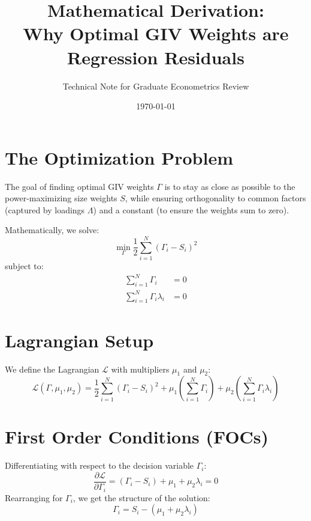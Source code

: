 \documentclass[11pt]{article}
\title{\color{DeepNavy}\huge Mathematical Derivation: \\ \Large Why Optimal GIV Weights are Regression Residuals}
\author{Technical Note for Graduate Econometrics Review}
\date{\today}
\begin{document}
\maketitle

\section{The Optimization Problem}
The goal of finding optimal GIV weights $\Gamma$ is to stay as close as possible to the power-maximizing size weights $S$, while ensuring orthogonality to common factors (captured by loadings $\Lambda$) and a constant (to ensure the weights sum to zero).

Mathematically, we solve:
\begin{equation}
\min_{\Gamma} \frac{1}{2} \sum_{i=1}^N (\Gamma_i - S_i)^2 
\end{equation}
subject to:
\begin{align}
\sum_{i=1}^N \Gamma_i &= 0 \tag{Constraint 1: Sum to Zero} \\
\sum_{i=1}^N \Gamma_i \lambda_i &= 0 \tag{Constraint 2: Orthogonality to $\lambda$}
\end{align}

\section{Lagrangian Setup}
We define the Lagrangian $\mathcal{L}$ with multipliers $\mu_1$ and $\mu_2$:
\begin{equation}
\mathcal{L}(\Gamma, \mu_1, \mu_2) = \frac{1}{2} \sum_{i=1}^N (\Gamma_i - S_i)^2 + \mu_1 \left( \sum_{i=1}^N \Gamma_i \right) + \mu_2 \left( \sum_{i=1}^N \Gamma_i \lambda_i \right)
\end{equation}

\section{First Order Conditions (FOCs)}
Differentiating with respect to the decision variable $\Gamma_i$:
\begin{equation}
\frac{\partial \mathcal{L}}{\partial \Gamma_i} = (\Gamma_i - S_i) + \mu_1 + \mu_2 \lambda_i = 0
\end{equation}
Rearranging for $\Gamma_i$, we get the structure of the solution:
\begin{equation} \label{eq:gamma_sol}
\Gamma_i = S_i - (\mu_1 + \mu_2 \lambda_i)
\end{equation}
\end{document}
